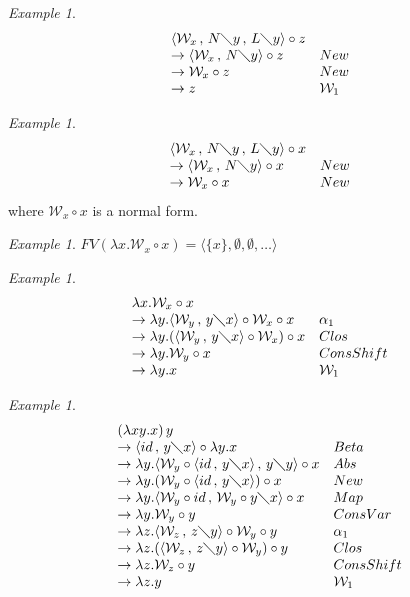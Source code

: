 \documentclass[11pt]{amsart}
\theoremstyle{plain}
\theoremstyle{definition}
\theoremstyle{remark}
\newtheorem{example}[theorem]{Example}
\numberwithin{equation}{section}
\newcommand{\ci}{\circ}
\newcommand{\mi}{\,,\,}
\newcommand{\is}{\diagdown}
\newcommand{\la}{\langle}
\newcommand{\ra}{\rangle}
\renewcommand{\pi}{\mathcal{W}}
\begin{document}
\begin{example}$$\begin{array}{ll}
\langle \pi_x\mi N\is y\mi L\is y\rangle\ci z &
\\
\rightarrow\langle \pi_x\mi N\is y\rangle\ci z &
New\\
\rightarrow\pi_x\ci z & New\\
\rightarrow z & \pi_1
\end{array}$$
\end{example}
\begin{example}$$\begin{array}{ll}
\langle\pi_x\mi N\is y\mi L\is y\rangle\ci x &
\\
\rightarrow\langle\pi_x\mi N\is y\rangle\ci
x & New\\
\rightarrow\pi_x\ci  x & New \end{array}$$
 where $\pi_x\ci x$ is a
normal form.
\end{example}
\begin{example}
$FV(\lambda x.\pi_x\ci x)=\la\{x\},\emptyset,\emptyset,\ldots\ra$
\end{example}
\begin{example}$$\begin{array}{ll}
 \lambda x.\pi_x\ci x & \\
 \rightarrow\lambda
y.\langle\pi_y\mi y\is x\rangle\ci \pi_x\ci x &
\alpha_1\\
\rightarrow\lambda y.(\langle\pi_y\mi y\is x\rangle\ci \pi_x)\ci x
& Clos\\
 \rightarrow\lambda y.\pi_y\ci
x & ConsShift\\
\rightarrow\lambda y.x & \pi_1
\end{array}$$
\end{example}
\begin{example}$$\begin{array}{ll}
(\lambda x y.x)\,y & \\
\rightarrow\langle id\mi y\is x\rangle\ci \lambda y.x &
Beta\\
\rightarrow\lambda y.\langle\pi_y\ci \langle id\mi y\is
x\rangle\mi y\is y\rangle\ci x & Abs\\
 \rightarrow\lambda
y.(\pi_y\ci \langle id\mi y\is x\rangle)\ci x &
New\\
\rightarrow\lambda y.\langle\pi_y\ci id\mi \pi_y\ci y\is
x\rangle\ci x & Map\\
 \rightarrow \lambda y.\pi_y\ci
y & ConsVar\\
\rightarrow\lambda z.\langle\pi_z\mi z\is y\rangle\ci \pi_y\ci y &
\alpha_1\\
\rightarrow\lambda z.(\langle\pi_z\mi z\is y\rangle\ci \pi_y)\ci y
& Clos\\
 \rightarrow\lambda z.\pi_z\ci
y & ConsShift\\
\rightarrow\lambda z.y & \pi_1
\end{array}
$$
\end{example}
\end{document}
